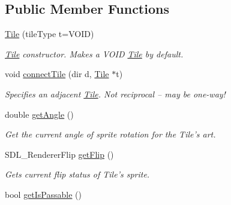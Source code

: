 \subsection*{Public Member Functions}
\begin{DoxyCompactItemize}
\item 
\hyperlink{class_tile_ae8839483d411c1324a0c89327a557194}{Tile} (tile\+Type t=V\+O\+ID)\hypertarget{class_tile_ae8839483d411c1324a0c89327a557194}{}\label{class_tile_ae8839483d411c1324a0c89327a557194}

\begin{DoxyCompactList}\small\item\em \hyperlink{class_tile}{Tile} constructor. Makes a V\+O\+ID \hyperlink{class_tile}{Tile} by default. \end{DoxyCompactList}\item 
void \hyperlink{class_tile_ab29acce6f4bf7ea4617213269e8c3716}{connect\+Tile} (dir d, \hyperlink{class_tile}{Tile} $\ast$t)\hypertarget{class_tile_ab29acce6f4bf7ea4617213269e8c3716}{}\label{class_tile_ab29acce6f4bf7ea4617213269e8c3716}

\begin{DoxyCompactList}\small\item\em Specifies an adjacent \hyperlink{class_tile}{Tile}. Not reciprocal -- may be one-\/way! \end{DoxyCompactList}\item 
double \hyperlink{class_tile_a947b6692bfcdd7b1adc59fcbee16c1fc}{get\+Angle} ()\hypertarget{class_tile_a947b6692bfcdd7b1adc59fcbee16c1fc}{}\label{class_tile_a947b6692bfcdd7b1adc59fcbee16c1fc}

\begin{DoxyCompactList}\small\item\em Get the current angle of sprite rotation for the Tile’s art. \end{DoxyCompactList}\item 
S\+D\+L\+\_\+\+Renderer\+Flip \hyperlink{class_tile_ad2d2b3bd012d3a54ccb51f6eb986115a}{get\+Flip} ()\hypertarget{class_tile_ad2d2b3bd012d3a54ccb51f6eb986115a}{}\label{class_tile_ad2d2b3bd012d3a54ccb51f6eb986115a}

\begin{DoxyCompactList}\small\item\em Gets current flip status of Tile’s sprite. \end{DoxyCompactList}\item 
bool \hyperlink{class_tile_aaddc2d065a537489c31de4a566bb0bd5}{get\+Is\+Passable} ()\hypertarget{class_tile_aaddc2d065a537489c31de4a566bb0bd5}{}\label{class_tile_aaddc2d065a537489c31de4a566bb0bd5}


\end{DoxyCompactItemize}
